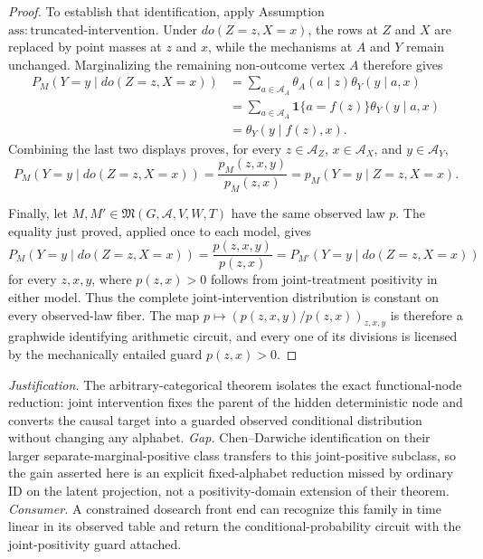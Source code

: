 \documentclass{article}
\begin{document}
\begin{proof}
To establish that identification, apply Assumption \(\mathrm{ass:truncated\text{-}intervention}\).  Under \(do(Z=z,X=x)\), the rows at \(Z\) and \(X\) are replaced by point masses at \(z\) and \(x\), while the mechanisms at \(A\) and \(Y\) remain unchanged.  Marginalizing the remaining non-outcome vertex \(A\) therefore gives
\[
\begin{aligned}
 P_M(Y=y\mid do(Z=z,X=x))
 &=\sum_{a\in\mathcal A_A}\theta_A(a\mid z)\theta_Y(y\mid a,x)\\
 &=\sum_{a\in\mathcal A_A}\mathbf 1\{a=f(z)\}\theta_Y(y\mid a,x)\\
 &=\theta_Y(y\mid f(z),x).
\end{aligned}
\]
Combining the last two displays proves, for every \(z\in\mathcal A_Z\), \(x\in\mathcal A_X\), and \(y\in\mathcal A_Y\),
\[
 P_M(Y=y\mid do(Z=z,X=x))
 =\frac{p_M(z,x,y)}{p_M(z,x)}
 =p_M(Y=y\mid Z=z,X=x).
\]

Finally, let \(M,M'\in\mathfrak M(G,\mathcal A,V,W,T)\) have the same observed law \(p\).  The equality just proved, applied once to each model, gives
\[
 P_M(Y=y\mid do(Z=z,X=x))
 =\frac{p(z,x,y)}{p(z,x)}
 =P_{M'}(Y=y\mid do(Z=z,X=x))
\]
for every \(z,x,y\), where \(p(z,x)>0\) follows from joint-treatment positivity in either model.  Thus the complete joint-intervention distribution is constant on every observed-law fiber.  The map \(p\mapsto(p(z,x,y)/p(z,x))_{z,x,y}\) is therefore a graphwide identifying arithmetic circuit, and every one of its divisions is licensed by the mechanically entailed guard \(p(z,x)>0\).
\end{proof}
\par\smallskip\noindent \textit{Justification.} The arbitrary-categorical theorem isolates the exact functional-node reduction: joint intervention fixes the parent of the hidden deterministic node and converts the causal target into a guarded observed conditional distribution without changing any alphabet. \textit{Gap.} Chen--Darwiche identification on their larger separate-marginal-positive class transfers to this joint-positive subclass, so the gain asserted here is an explicit fixed-alphabet reduction missed by ordinary ID on the latent projection, not a positivity-domain extension of their theorem. \textit{Consumer.} A constrained dosearch front end can recognize this family in time linear in its observed table and return the conditional-probability circuit with the joint-positivity guard attached.
\end{document}
